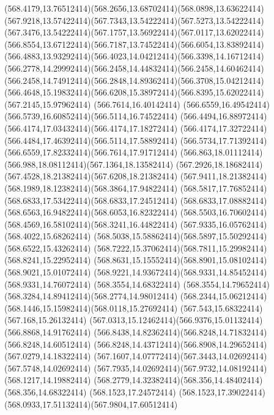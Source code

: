 {{	\curveto(568.4179,13.76512414)(568.2656,13.68702414)(568.0898,13.63622414)
	\curveto(567.9218,13.57422414)(567.7343,13.54222414)(567.5273,13.54222414)
	\curveto(567.3476,13.54222414)(567.1757,13.56922414)(567.0117,13.62022414)
	\curveto(566.8554,13.67122414)(566.7187,13.74522414)(566.6054,13.83892414)
	\curveto(566.4883,13.93292414)(566.4023,14.04212414)(566.3398,14.16712414)
	\curveto(566.2778,14.29992414)(566.2458,14.44832414)(566.2458,14.60462414)
	\curveto(566.2458,14.74912414)(566.2848,14.89362414)(566.3708,15.04212414)
	\curveto(566.4648,15.19832414)(566.6208,15.38972414)(566.8395,15.62022414)
	\lineto(567.2145,15.97962414)
	\lineto(566.7614,16.40142414)
	\curveto(566.6559,16.49542414)(566.5739,16.60852414)(566.5114,16.74522414)
	\curveto(566.4494,16.88972414)(566.4174,17.03432414)(566.4174,17.18272414)
	\curveto(566.4174,17.32722414)(566.4484,17.46392414)(566.5114,17.58892414)
	\curveto(566.5734,17.71392414)(566.6559,17.82332414)(566.7614,17.91712414)
	\curveto(566.863,18.01112414)(566.988,18.08112414)(567.1364,18.13582414)
	\curveto(567.2926,18.18682414)(567.4528,18.21382414)(567.6208,18.21382414)
	\curveto(567.9411,18.21382414)(568.1989,18.12382414)(568.3864,17.94822414)
	\curveto(568.5817,17.76852414)(568.6833,17.53422414)(568.6833,17.24512414)
	\curveto(568.6833,17.08882414)(568.6563,16.94822414)(568.6053,16.82322414)
	\curveto(568.5503,16.70602414)(568.4569,16.58102414)(568.3241,16.44822414)
	\lineto(567.9335,16.05762414)
	\lineto(568.4022,15.68262414)
	\curveto(568.5038,15.58862414)(568.5897,15.50292414)(568.6522,15.43262414)
	\curveto(568.7222,15.37062414)(568.7811,15.29982414)(568.8241,15.22952414)
	\curveto(568.8631,15.15552414)(568.8901,15.08102414)(568.9021,15.01072414)
	\curveto(568.9221,14.93672414)(568.9331,14.85452414)(568.9331,14.76072414)
	\closepath
	\moveto(568.3554,14.68322414)
	\curveto(568.3554,14.79652414)(568.3284,14.89412414)(568.2774,14.98012414)
	\curveto(568.2344,15.06212414)(568.1446,15.15982414)(568.0118,15.27692414)
	\lineto(567.543,15.68322414)
	\lineto(567.168,15.26132414)
	\curveto(567.0313,15.12462414)(566.9376,15.01132414)(566.8868,14.91762414)
	\curveto(566.8438,14.82362414)(566.8248,14.71832414)(566.8248,14.60512414)
	\curveto(566.8248,14.43712414)(566.8908,14.29652414)(567.0279,14.18322414)
	\curveto(567.1607,14.07772414)(567.3443,14.02692414)(567.5748,14.02692414)
	\curveto(567.7935,14.02692414)(567.9732,14.08192414)(568.1217,14.19882414)
	\curveto(568.2779,14.32382414)(568.356,14.48402414)(568.356,14.68322414)
	\closepath
	\moveto(568.1523,17.24572414)
	\curveto(568.1523,17.39022414)(568.0933,17.51132414)(567.9804,17.60512414)
}}
